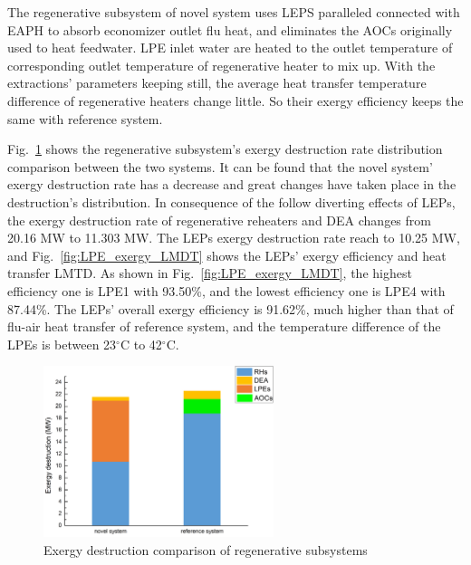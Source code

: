\documentclass[preprint,12pt]{elsarticle}
\begin{document}



The regenerative subsystem of novel system uses LEPS paralleled connected with EAPH to absorb economizer outlet flu heat, and eliminates the AOCs originally used to heat feedwater.
LPE inlet water are heated to the outlet temperature of corresponding outlet temperature of regenerative heater to mix up.
With the extractions' parameters keeping still, the average heat transfer temperature difference of regenerative heaters change little.
So their exergy efficiency keeps the same with reference system.

Fig.~\ref{fig:regenerative_subsys_compare} shows the regenerative subsystem's exergy destruction rate distribution comparison between the two systems.
It can be found that the novel system' exergy destruction rate has a decrease and great changes have taken place in the destruction's distribution.
In consequence of the follow diverting effects of LEPs, the exergy destruction rate of regenerative reheaters and DEA changes from 20.16 MW to 11.303 MW.
The LEPs exergy destruction rate reach to 10.25 MW, and Fig.~\ref{fig:LPE_exergy_LMDT} shows the LEPs' exergy efficiency and heat transfer LMTD.
 As shown in Fig.~\ref{fig:LPE_exergy_LMDT}, the highest efficiency one is LPE1 with 93.50\%, and the lowest efficiency one is LPE4 with 87.44\%. 
The LEPs' overall exergy efficiency is 91.62\%, much higher than that of flu-air heat transfer of reference system, and the temperature difference of the LPEs is between 23$^\circ$C to 42$^\circ$C.

\begin{figure}[htbp]
\centering
\includegraphics[width=0.6\textwidth]{fig/regenerative_subsys_compare.png}
\caption{Exergy destruction comparison of regenerative subsystems} 
\label{fig:regenerative_subsys_compare}
\end{figure}
\end{document}
